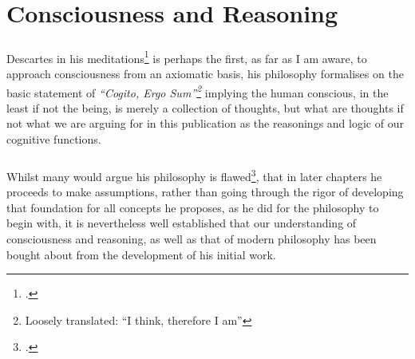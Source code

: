 \chapter{Consciousness and Reasoning}\label{chapter:consciousnessandreasoning}

\paragraph{}Descartes in his meditations\footcite{descartes1986meditations} is perhaps the first, as far as I am aware, to approach consciousness from an axiomatic basis, his philosophy formalises on the basic statement of \emph{``Cogito, Ergo Sum''\footnote{Loosely translated: ``I think, therefore I am''}} implying the human conscious, in the least if not the being, is merely a collection of thoughts, but what are thoughts if not what we are arguing for in this publication as the reasonings and logic of our cognitive functions.

\paragraph{}Whilst many would argue his philosophy is flawed\footcite[A great summary of some retorts can be found in Chapter 1 of][]{gottlieb2016the}, that in later chapters he proceeds to make assumptions, rather than going through the rigor of developing that foundation for all concepts he proposes, as he did for the philosophy to begin with, it is nevertheless well established that our understanding of consciousness and reasoning, as well as that of modern philosophy has been bought about from the development of his initial work. 